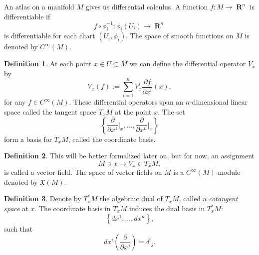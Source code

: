 \documentclass[a4paper]{article}
\DeclareMathOperator{\R}{\mathbf{R}}
\theoremstyle{definition}
\newtheorem{defn}{Definition}
\theoremstyle{plain}
\begin{document}
    An atlas on a manifold $M$ gives us differential
    calculus. A function $f : M \to \R^{n}$ is
    differentiable if
    \begin{equation}
        f \circ \phi_i^{-1} : \phi_i(U_i) \to \R^{n}
    \end{equation}
    is differentiable for each chart $(U_i,\phi_i)$. The
    space of smooth functions on $M$ is denoted by
    $C^{\infty}(M)$. 

    \begin{defn}
        At each point $x \in U \subset M$ we can define the
        differential operator $V_x$ by
        \begin{equation}
            V_x(f)
            := \sum_{i=1}^{n} V_x^{i} \frac{\partial
            f}{\partial x^{i}}(x),
        \end{equation}
        for any $f \in C^{\infty}(M)$. These differential
        operators span an $n$-dimensional linear space
        called the tangent space $T_xM$ at the point $x$.
        The set
        \begin{equation}
            \left\{
                \frac{\partial}{\partial x^{1}}\big|_x,
                \ldots,
                \frac{\partial}{\partial x^{n}}\big|_x
            \right\}
        \end{equation}
        form a basis for $T_xM$, called the coordinate
        basis.
    \end{defn}

    \begin{defn}
        This will be better formalized later on, but for
        now, an assignment
        \begin{equation}
            M \ni x \to V_x \in T_xM,
        \end{equation}
        is called a vector field. The space of vector fields
        on $M$ is a $C^{\infty}(M)$-module denoted by
        $\mathfrak{X}(M)$.
    \end{defn}

    \begin{defn}
        Denote by $T_x^{*}M$ the algebraic dual of $T_xM$,
        called a \textit{cotangent space} at $x$. The
        coordinate basis in $T_xM$ induces the dual basis in
        $T_x^{*}M$:
        \begin{equation}
            \left\{
                dx^{1},\ldots,dx^{n}
            \right\},
        \end{equation}
        such that
        \begin{equation}
            dx^{i} \left( \frac{\partial}{\partial x^{j}}
            \right) = \delta^{i}{}_{j}.
        \end{equation}
    \end{defn}
    
\end{document}
